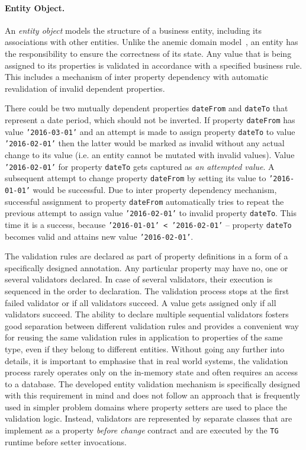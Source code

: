 \documentclass[a4paper,12pt,oneside,openright,final]{memoir} %
\begin{document}
	\paragraph{Entity Object.} 	
  	An \emph{entity object} models the structure of a business entity, including its associations with other entities.
	Unlike the anemic domain model~\cite{fowler2003}, an entity has the responsibility to ensure the correctness of its state.
	Any value that is being assigned to its properties is validated in accordance with a specified business rule.
	This includes a mechanism of inter property dependency with automatic revalidation of invalid dependent properties.
	
	\begin{tcolorbox}[title=Example: dependent properties]
	\footnotesize
		There could be two mutually dependent properties \texttt{dateFrom} and \texttt{dateTo} that represent a date period, which should not be inverted.
		If property \texttt{dateFrom} has value \texttt{'2016-03-01'} and an attempt is made to assign property \texttt{dateTo} to value \texttt{'2016-02-01'} then the latter would be marked as invalid without any actual change to its value (i.e. an entity cannot be mutated with invalid values).
		Value \texttt{'2016-02-01'} for property \texttt{dateTo} gets captured as \emph{an attempted value}.
		A subsequent attempt to change property \texttt{dateFrom} by setting its value to \texttt{'2016-01-01'} would be successful.
		Due to inter property dependency mechanism, successful assignment to property \texttt{dateFrom} automatically tries to repeat the previous attempt to assign value \texttt{'2016-02-01'} to invalid property \texttt{dateTo}.
		This time it is a success, because \texttt{'2016-01-01' < '2016-02-01'} -- property \texttt{dateTo} becomes valid and attains new value \texttt{'2016-02-01'}.
 	\end{tcolorbox}
	
	The validation rules are declared as part of property definitions in a form of a specifically designed annotation.
	Any particular property may have no, one or several validators declared.
	In case of several validators, their execution is sequenced in the order to declaration.
	The validation process stops at the first failed validator or if all validators succeed.
	A value gets assigned only if all validators succeed.
	The ability to declare multiple sequential validators fosters good separation between different validation rules and provides a convenient way for reusing the same validation rules in application to properties of the same type, even if they belong to different entities.
	Without going any further into details, it is important to emphasise that in real world systems, the validation process rarely operates only on the in-memory state and often requires an access to a database.
	The developed entity validation mechanism is specifically designed with this requirement in mind and does not follow an approach that is frequently used in simpler problem domains where property setters are used to place the validation logic.
	Instead, validators are represented by separate classes that are implement as a property \emph{before change} contract and are executed by the \texttt{TG} runtime before setter invocations.
\end{document}
